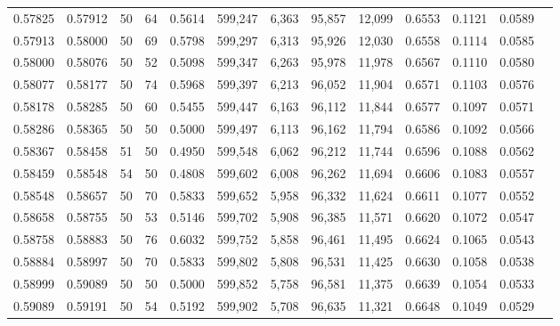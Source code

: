 \begin{tabular}{rrrrrrrrrrrrr}
0.57825 & 0.57912 &    50 &  64 &                                     0.5614 & 599,247 &   6,363 &  95,857 &  12,099 & 0.6553 & 0.1121 & 0.0589 \\
0.57913 & 0.58000 &    50 &  69 &                                     0.5798 & 599,297 &   6,313 &  95,926 &  12,030 & 0.6558 & 0.1114 & 0.0585 \\
0.58000 & 0.58076 &    50 &  52 &                                     0.5098 & 599,347 &   6,263 &  95,978 &  11,978 & 0.6567 & 0.1110 & 0.0580 \\
0.58077 & 0.58177 &    50 &  74 &                                     0.5968 & 599,397 &   6,213 &  96,052 &  11,904 & 0.6571 & 0.1103 & 0.0576 \\
0.58178 & 0.58285 &    50 &  60 &                                     0.5455 & 599,447 &   6,163 &  96,112 &  11,844 & 0.6577 & 0.1097 & 0.0571 \\
0.58286 & 0.58365 &    50 &  50 &                                     0.5000 & 599,497 &   6,113 &  96,162 &  11,794 & 0.6586 & 0.1092 & 0.0566 \\
0.58367 & 0.58458 &    51 &  50 &                                     0.4950 & 599,548 &   6,062 &  96,212 &  11,744 & 0.6596 & 0.1088 & 0.0562 \\
0.58459 & 0.58548 &    54 &  50 &                                     0.4808 & 599,602 &   6,008 &  96,262 &  11,694 & 0.6606 & 0.1083 & 0.0557 \\
0.58548 & 0.58657 &    50 &  70 &                                     0.5833 & 599,652 &   5,958 &  96,332 &  11,624 & 0.6611 & 0.1077 & 0.0552 \\
0.58658 & 0.58755 &    50 &  53 &                                     0.5146 & 599,702 &   5,908 &  96,385 &  11,571 & 0.6620 & 0.1072 & 0.0547 \\
0.58758 & 0.58883 &    50 &  76 &                                     0.6032 & 599,752 &   5,858 &  96,461 &  11,495 & 0.6624 & 0.1065 & 0.0543 \\
0.58884 & 0.58997 &    50 &  70 &                                     0.5833 & 599,802 &   5,808 &  96,531 &  11,425 & 0.6630 & 0.1058 & 0.0538 \\
0.58999 & 0.59089 &    50 &  50 &                                     0.5000 & 599,852 &   5,758 &  96,581 &  11,375 & 0.6639 & 0.1054 & 0.0533 \\
0.59089 & 0.59191 &    50 &  54 &                                     0.5192 & 599,902 &   5,708 &  96,635 &  11,321 & 0.6648 & 0.1049 & 0.0529 \\

\end{tabular}

